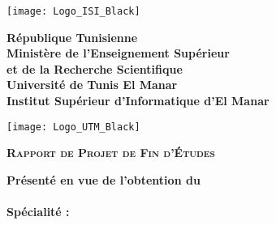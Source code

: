 


\thispagestyle{cover}%
\hspace{-47pt}
\begin{minipage}[l]{0.2\columnwidth}
\vspace{6mm}
\texttt{[image: Logo\_ISI\_Black]}\\
\end{minipage}
\hfill
\begin{minipage}[l]{0.6\columnwidth}
\centering
\footnotesize
\textbf{{République Tunisienne}}\\
\vspace{1.5mm}
\textbf{{Ministère de l'Enseignement Supérieur\\
et de la Recherche Scientifique}}\\
\vspace{1.5mm}
\textbf{{Université de Tunis El Manar}}\\
\vspace{1.5mm}
\textbf{{Institut Supérieur d'Informatique d’El Manar}}
\end{minipage}
\hfill
\begin{minipage}[l]{0.02\columnwidth}
\end{minipage}
\hfill
\begin{minipage}[l]{0.18\columnwidth}
\vspace{6mm}
\texttt{[image: Logo\_UTM\_Black]}\\
\end{minipage}
\vskip1.5cm

\begin{center}
{\LARGE{\textbf{\textsc{Rapport de Projet de Fin d'\'Etudes}}}}\\
\vskip0.5cm
\large

{\textbf{Présenté en vue de l'obtention du}}\\
\vskip2mm
{\textbf{\@diplomaName}}\\
{\textbf{Spécialité : \@speciality}}\\
{}
\end{center}

